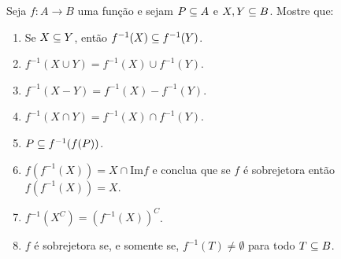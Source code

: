 \documentclass[12pt]{exam}
\begin{document}
    \questao{} Seja $f : A \to B$ uma fun{\c c}{\~a}o e sejam $P \subseteq
    A$ e $X, Y\subseteq B$. Mostre que:
    \begin{enumerate}[label={\alph*})]
        \item Se $X\subseteq Y$, ent{\~a}o $f^{-1}(X)\subseteq f^{-1}(Y)$.

        \item $f^{-1}(X\cup Y)=f^{-1}(X)\cup f^{-1}(Y)$.

        \item $f^{-1}(X - Y) = f^{-1}(X) - f^{-1}(Y)$.

        \item $f^{-1}(X\cap Y)= f^{-1}(X)\cap f^{-1}(Y)$.

        \item $P\subseteq f^{-1}(f(P))$.

        \item $f(f^{-1}(X))= X \cap \mbox{Im}f$ e conclua que se $f$ {\'e} sobrejetora ent{\~a}o
        $f(f^{-1}(X))=X$.
        \item $f^{-1}(X^C) = (f^{-1}(X))^C$.

        \item $f$ \'e sobrejetora se, e somente se, $f^{-1}(T) \ne \emptyset$ para todo $T \subseteq B$.
    \end{enumerate}
\end{document}
